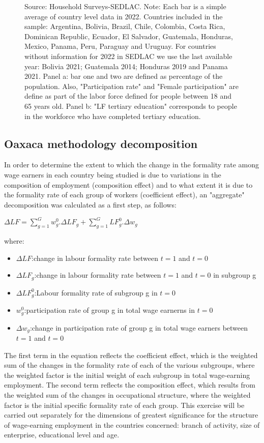 \documentclass[english]{article}
\begin{document}
\begin{figure}[H]
                 \footnotesize{Source: Household Surveys-SEDLAC.}
                \footnotesize{Note: Each bar is a simple average of country level data in 2022. Countries included in the sample: Argentina, Bolivia, Brazil, Chile, Colombia, Costa Rica, Dominican Republic, Ecuador, El Salvador, Guatemala, Honduras, Mexico, Panama, Peru, Paraguay and Uruguay. For countries without information for 2022 in SEDLAC we use the last available year: Bolivia 2021; Guatemala 2014; Honduras 2019 and Panama 2021. Panel a: bar one and two are defined as percentage of the population. Also, "Participation rate" and "Female participation" are define as part of the labor force defined for people between 18 and 65 years old. Panel b: "LF tertiary education" corresponds to people in the workforce who have completed tertiary education.}
        
            \end{figure}

\subsection{Oaxaca methodology decomposition}
In order to determine the extent to which the change in the formality rate among wage earners in each country being studied is due to variations in the composition of employment (composition effect) and to what extent it is due to the formality rate of each group of workers (coefficient effect), an "aggregate" decomposition was calculated as a first step, as follows:

${\Delta}LF=\sum_{g=1}^{G}w_g^{0}.{\Delta}LF_g+\sum_{g=1}^{G}LF_g^{0}.{\Delta}w_g$

where:
\begin{itemize}

\item ${\Delta}LF$:change in labour formality rate between $t=1$ and $t=0$ 
\item ${\Delta}LF_g$:change in labour formality rate between $t=1$ and $t=0$ in subgroup g
\item ${\Delta}LF_g^{0}$:Labour formality rate of subgroup g in $t=0$
\item $w_g^{0}$:participation rate of group g in total wage earnerns in $t=0$
\item ${\Delta}w_g$:change in participation rate of group g in total wage earners between $t=1$ and $t=0$ 
\end{itemize}

The first term in the equation reflects the coefficient effect, which is the weighted sum of the changes in the formality rate of each of the various subgroups, where the weighted factor is the initial weight of each subgroup in total wage-earning employment. The second term reflects the composition effect, which results from the weighted sum of the changes in occupational structure, where the weighted factor is the initial specific formality rate of each group.
This exercise will be carried out separately for the dimensions of greatest significance for the structure of wage-earning employment in the countries concerned: branch of activity, size of enterprise, educational level and age.
\end{document}
